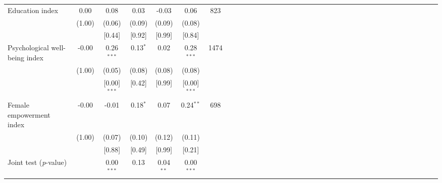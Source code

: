 {\begin{tabular}{l*{6}{SSSSSc}}
Education index&     0.00&     0.08&     0.03&    -0.03&     0.06&      823\\
          &   (1.00)&   (0.06)&   (0.09)&   (0.09)&   (0.08)&         \\
          &         &   [0.44]&   [0.92]&   [0.99]&   [0.84]&         \\
Psychological well-being index&    -0.00&0.26$^{***}$&0.13$^{*}$&     0.02&0.28$^{***}$&     1474\\
          &   (1.00)&   (0.05)&   (0.08)&   (0.08)&   (0.08)&         \\
          &         &[0.00]$^{***}$&   [0.42]&   [0.99]&[0.00]$^{***}$&         \\
Female empowerment index&    -0.00&    -0.01&0.18$^{*}$&     0.07&0.24$^{**}$&      698\\
          &   (1.00)&   (0.07)&   (0.10)&   (0.12)&   (0.11)&         \\
          &         &   [0.88]&   [0.49]&   [0.99]&   [0.21]&         \\
\midrule Joint test (\emph{p}-value)&         &0.00$^{***}$&     0.13&0.04$^{**}$&0.00$^{***}$&         \\
\bottomrule
\end{tabular}
}
